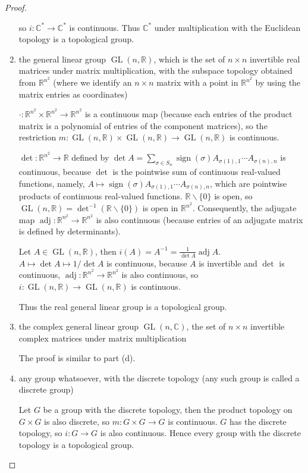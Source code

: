 \begin{proof}
\begin{enumerate}[label={(\alph*)}]
              so $i: \mathbb{C}^{*}\to \mathbb{C}^{*}$ is continuous. Thus $\mathbb{C}^{*}$ under multiplication with the Euclidean topology is a topological group.
        \item the general linear group $\operatorname{GL}(n, \mathbb{R})$, which is the set of $n\times n$ invertible real matrices under matrix multiplication, with the subspace topology obtained from $\mathbb{R}^{n^{2}}$ (where we identify an $n\times n$ matrix with a point in $\mathbb{R}^{n^{2}}$ by using the matrix entries as coordinates)

              $\cdot: \mathbb{R}^{n^{2}}\times \mathbb{R}^{n^{2}}\to \mathbb{R}^{n^{2}}$ is a continuous map (because each entries of the product matrix is a polynomial of entries of the component matrices), so the restriction $m: \operatorname{GL}(n, \mathbb{R})\times\operatorname{GL}(n, \mathbb{R})\to \operatorname{GL}(n, \mathbb{R})$ is continuous.

              $\det: \mathbb{R}^{n^{2}}\to \mathbb{R}$ defined by $\det A = \sum_{\sigma\in S_{n}}\operatorname{sign}(\sigma)A_{\sigma(1),1}\cdots A_{\sigma(n),n}$ is continuous, because $\det$ is the pointwise sum of continuous real-valued functions, namely, $A\mapsto \operatorname{sign}(\sigma)A_{\sigma(1),1}\cdots A_{\sigma(n),n}$, which are pointwise products of continuous real-valued functions. $\mathbb{R}\smallsetminus\{0\}$ is open, so $\operatorname{GL}(n, \mathbb{R}) = \det^{-1}(\mathbb{R}\smallsetminus\{0\})$ is open in $\mathbb{R}^{n^{2}}$. Consequently, the adjugate map $\operatorname{adj}: \mathbb{R}^{n^{2}}\to \mathbb{R}^{n^{2}}$ is also continuous (because entries of an adjugate matrix is defined by determinants).

              Let $A\in \operatorname{GL}(n, \mathbb{R})$, then $i(A) = A^{-1} = \frac{1}{\det A}\operatorname{adj}A$. $A\mapsto \det A\mapsto 1/\det A$ is continuous, because $A$ is invertible and $\det$ is continuous, $\operatorname{adj}: \mathbb{R}^{n^{2}}\to \mathbb{R}^{n^{2}}$ is also continuous, so $i: \operatorname{GL}(n, \mathbb{R})\to \operatorname{GL}(n, \mathbb{R})$ is continuous.

              Thus the real general linear group is a topological group.
        \item the complex general linear group $\operatorname{GL}(n, \mathbb{C})$, the set of $n\times n$ invertible complex matrices under matrix multiplication

              The proof is similar to part (d).
        \item any group whatsoever, with the discrete topology (any such group is called a discrete group)

              Let $G$ be a group with the discrete topology, then the product topology on $G\times G$ is also discrete, so $m: G\times G\to G$ is continuous. $G$ has the discrete topology, so $i: G\to G$ is also continuous. Hence every group with the discrete topology is a topological group.
    \end{enumerate}
\end{proof}

